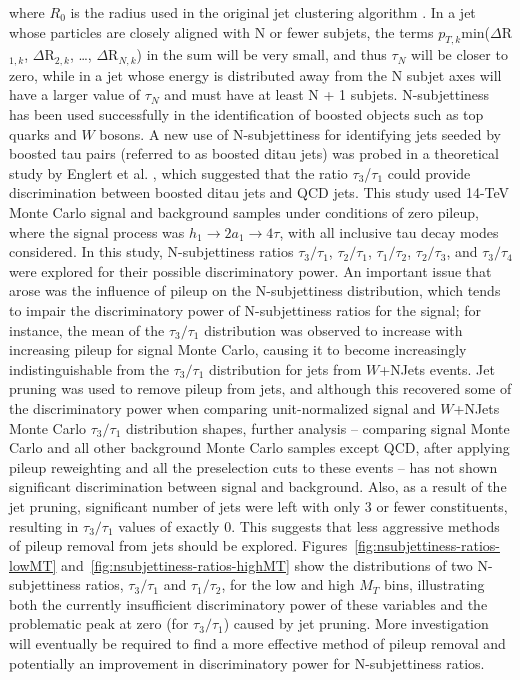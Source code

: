 \noindent where $R_{0}$ is the radius used in the original jet clustering algorithm \cite{Thaler:2010tr}.\newline
In a jet whose particles are closely aligned with N or fewer subjets, the terms $p_{T,k}$min($\Delta$R$_{1,k}$, $\Delta$R$_{2,k}$, \dots, $\Delta$R$_{N,k}$) in the sum will be very small, and thus $\tau_{N}$ will be closer to zero, while in a jet whose energy is distributed away from the N subjet axes will have a larger value of $\tau_{N}$ and must have at least N + 1 subjets.\newline
N-subjettiness has been used successfully in the identification of boosted objects such as top quarks and $W$ bosons. A new use of N-subjettiness for identifying jets seeded by boosted tau pairs (referred to as boosted ditau jets) was probed in a theoretical study by Englert et al. \cite{Englert:2011iz}, which suggested that the ratio $\tau_{3}$/$\tau_{1}$ could provide discrimination between boosted ditau jets and QCD jets. This study used 14-TeV Monte Carlo signal and background samples under conditions of zero pileup, where the signal process was  $h_{1}\rightarrow 2a_{1}\rightarrow 4\tau$, with all inclusive tau decay modes considered.\newline
In this study, N-subjettiness ratios $\tau_{3}/\tau_{1}$, $\tau_{2}/\tau_{1}$, $\tau_{1}/\tau_{2}$, $\tau_{2}/\tau_{3}$, and $\tau_{3}/\tau_{4}$  were explored for their possible discriminatory power. An important issue that arose was the influence of pileup on the N-subjettiness distribution, which tends to impair the discriminatory power of N-subjettiness ratios for the signal; for instance, the mean of the $\tau_{3}/\tau_{1}$ distribution was observed to increase with increasing pileup for signal Monte Carlo, causing it to become increasingly indistinguishable from the $\tau_{3}/\tau_{1}$ distribution for jets from $W$+NJets events. Jet pruning was used to remove pileup from jets, and although this recovered some of the discriminatory power when comparing unit-normalized signal and $W$+NJets Monte Carlo $\tau_{3}/\tau_{1}$ distribution shapes, further analysis -- comparing signal Monte Carlo and all other background Monte Carlo samples except QCD, after applying pileup reweighting and all the preselection cuts to these events -- has not shown significant discrimination between signal and background. Also, as a result of the jet pruning, significant number of jets were left with only 3 or fewer constituents, resulting in $\tau_{3}/\tau_{1}$ values of exactly 0. This suggests that less aggressive methods of pileup removal from jets should be explored. Figures~\ref{fig:nsubjettiness-ratios-lowMT} and~\ref{fig:nsubjettiness-ratios-highMT} show the distributions of two N-subjettiness ratios, $\tau_{3}/\tau_{1}$ and $\tau_{1}/\tau_{2}$, for the low and high $M_{T}$ bins, illustrating both the currently insufficient discriminatory power of these variables and the problematic peak at zero (for $\tau_{3}/\tau_{1}$) caused by jet pruning. More investigation will eventually be required to find a more effective method of pileup removal and potentially an improvement in discriminatory power for N-subjettiness ratios.

